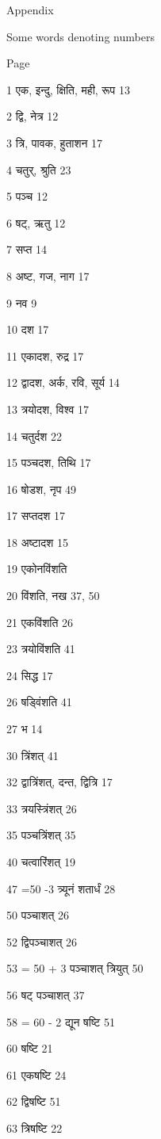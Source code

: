 \documentclass[]{article}
\date{}
\begin{document}
{Appendix}

{Some words denoting numbers}

{ Page}

{1 एक, इन्दु, क्षिति, मही, रूप 13}

{2 द्वि, नेत्र 12}

{3 त्रि, पावक, हुताशन 17}

{4 चतुर्, श्रुति 23}

{5 पञ्च 12}

{6 षट्, ऋतु 12}

{7 सप्त 14}

{8 अष्ट, गज, नाग 17}

{9 नव 9}

{10 दश 17}

{11 एकादश, रुद्र 17}

{12 द्वादश, अर्क, रवि, सूर्य 14}

{13 त्रयोदश, विश्व 17 }

{14 चतुर्दश 22}

{15 पञ्चदश, तिथि 17}

{16 षोडश, नृप 49}

{17 सप्तदश 17 }

{18 अष्टादश 15}

{19 एकोनविंशति}

{20 विंशति, नख 37, 50}

{21 एकविंशति 26}

{23 त्रयोविंशति 41}

{24 सिद्ध 17}

{26 षड्विंशति 41}

{27 भ 14}

{30 त्रिंशत् 41}

{32 द्वात्रिंशत्, दन्त, द्वित्रि 17}

{33 त्रयस्त्रिंशत् 26}

{35 पञ्चत्रिंशत् 35 }

{40 चत्वारिंशत् 19}

{47 =50 -3 त्र्यूनं शतार्धं 28}

{50 पञ्चाशत् 26}

{52 द्विपञ्चाशत् 26}

{53 = 50 + 3 पञ्चाशत् त्रियुत् 50}

{56 षट् पञ्चाशत् 37}

{58 = 60 - 2}{ }{द्यून}{ }{षष्टि 51}

{60 षष्टि 21}

{61 एकषष्टि 24}

{62 द्विषष्टि 51}

{63 त्रिषष्टि 22}
\end{document}

